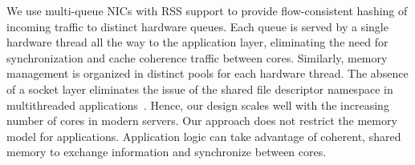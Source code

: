 






 We use
multi-queue NICs with RSS support to provide flow-consistent hashing
of incoming traffic to distinct hardware queues. Each queue is served
by a single hardware thread all the way to the application layer,
eliminating the need for synchronization and cache coherence traffic
between cores. Similarly, memory management is organized in distinct
pools for each hardware thread. The absence of a socket layer
eliminates the issue of the shared file descriptor namespace in
multithreaded
applications~\cite{DBLP:conf/sosp/ClementsKZMK13}. Hence, our design
scales well with the increasing number of cores in modern servers. Our
approach does not restrict the memory model for
applications. Application logic can take advantage of coherent, shared
memory to exchange information and synchronize between cores.




